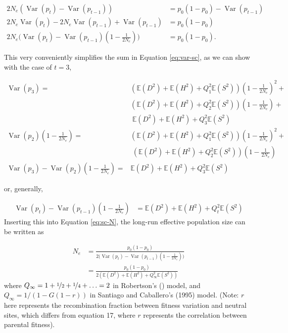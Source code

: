 \documentclass[11pt]{article}
\newcommand{\nnn}{\nonumber}
\newcommand{\E}{\mathbb{E}}
\DeclareMathOperator{\var}{Var}
\begin{document}
\begin{align}
  2N_e(\var(p_t) - \var(p_{t-1})) &= p_0 (1-p_0) - \var(p_{t-1}) \nonumber \\
  2N_e \var(p_t) - 2N_e \var(p_{t-1}) + \var(p_{t-1}) &= p_0(1-p_0) \nonumber \\
  2N_e \bigg(\var(p_t) - \var(p_{t-1}) \left(1 - \frac{1}{2N_e} \right)\bigg) &= p_0(1-p_0).
  \label{eq:sc-N}
\end{align}

This very conveniently simplifies the sum in Equation \eqref{eq:var-sc}, as we
can show with the case of $t=3$,

\begin{align}
  \var(p_3) = &\left(\E(D^2)+\E(H^2)+Q_1^2 \E(S^2)\right) \left(1-\frac{1}{2 N_e}\right)^2 + \nonumber \\
              &\left(\E(D^2)+\E(H^2)+Q_2^2 \E(S^2)\right) \left(1-\frac{1}{2 N_e}\right) + \nonumber \\
              &\;\E(D^2)+\E(H^2)+Q_3^2 \E(S^2) \nonumber \\
  \var(p_2)\left(1-\frac{1}{2N_e}\right) = &\left(\E(D^2)+\E(H^2)+Q_1^2 \E(S^2)\right) \left(1-\frac{1}{2N_e}\right)^2 + \nonumber \\
                                         &\;(\E(D^2)+\E(H^2)+Q_2^2 \E(S^2)) \left(1-\frac{1}{2N_e}\right) \nonumber \\
  \var(p_3) - \var(p_2)\left(1-\frac{1}{2N_e}\right) = &\E(D^2) + \E(H^2) + Q_3^2 \E(S^2) \nnn
\end{align}

or, generally, 

\begin{align}
  \var(p_t) - \var(p_{t-1})\left(1-\frac{1}{2N_e}\right) &= \E(D^2) + \E(H^2) + Q_t^2 \E(S^2)
\end{align}
%
Inserting this into Equation \eqref{eq:sc-N}, the long-run effective population
size can be written as

\begin{align}
  N_e &= \frac{p_0(1-p_0)}{2\bigg(\var(p_t) - \var(p_{t-1}) \left(1 - \frac{1}{2N_e} \right)\bigg)} \nonumber \\
      &= \frac{p_0(1-p_0)}{2\left( \E(D^2) + \E(H^2) + Q_\infty^2 \E(S^2) \right)}
  \label{sc:ne-eqn}
\end{align}
%
where $Q_\infty = 1 + \nicefrac{1}{2} + \nicefrac{1}{4} + \ldots = 2$ in
Robertson's (\citeyear{Robertson1961-ho}) model, and $Q_\infty = 1/(1 - G
(1-r))$ in Santiago and Caballero's (1995) model. (Note: $r$ here represents
the recombination fraction between fitness variation and neutral sites, which
differs from \textcite{Santiago1995-hx} equation 17, where $r$ represents the
correlation between parental fitness).
\end{document}
